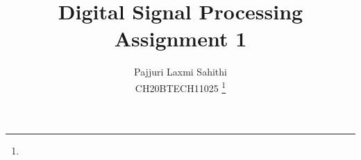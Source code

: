 \documentclass[journal,12pt,twocolumn]{IEEEtran}
\begin{document}
\let\vec\mathbf
\renewcommand{\thefigure}{\arabic{section}.\arabic{figure}}
\makeatletter
{}
\makeatother
\def\putbox#1#2#3{\makebox[0in][l]{\makebox[#1][l]{}\raisebox{\baselineskip}[0in][0in]{\raisebox{#2}[0in][0in]{#3}}}}
     \def\rightbox#1{\makebox[0in][r]{#1}}
     \def\centbox#1{\makebox[0in]{#1}}
     \def\topbox#1{\raisebox{-\baselineskip}[0in][0in]{#1}}
     \def\midbox#1{\raisebox{-0.5\baselineskip}[0in][0in]{#1}}
\vspace{3cm}
\title{ 
Digital Signal Processing\\Assignment 1
}
%
%
%
\author{ Pajjuri Laxmi Sahithi\\CH20BTECH11025 %
\thanks{}%
}
% 
%
\end{document}
